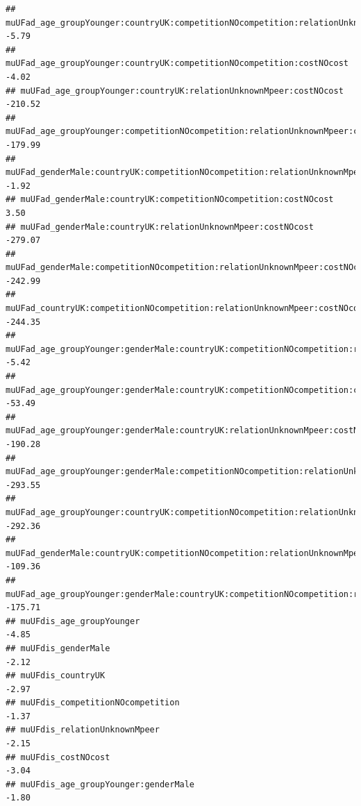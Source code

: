\documentclass[
]{article}
\begin{document}
\begin{verbatim}
## muUFad_age_groupYounger:countryUK:competitionNOcompetition:relationUnknownMpeer                           -5.79
## muUFad_age_groupYounger:countryUK:competitionNOcompetition:costNOcost                                     -4.02
## muUFad_age_groupYounger:countryUK:relationUnknownMpeer:costNOcost                                       -210.52
## muUFad_age_groupYounger:competitionNOcompetition:relationUnknownMpeer:costNOcost                        -179.99
## muUFad_genderMale:countryUK:competitionNOcompetition:relationUnknownMpeer                                 -1.92
## muUFad_genderMale:countryUK:competitionNOcompetition:costNOcost                                            3.50
## muUFad_genderMale:countryUK:relationUnknownMpeer:costNOcost                                             -279.07
## muUFad_genderMale:competitionNOcompetition:relationUnknownMpeer:costNOcost                              -242.99
## muUFad_countryUK:competitionNOcompetition:relationUnknownMpeer:costNOcost                               -244.35
## muUFad_age_groupYounger:genderMale:countryUK:competitionNOcompetition:relationUnknownMpeer                -5.42
## muUFad_age_groupYounger:genderMale:countryUK:competitionNOcompetition:costNOcost                         -53.49
## muUFad_age_groupYounger:genderMale:countryUK:relationUnknownMpeer:costNOcost                            -190.28
## muUFad_age_groupYounger:genderMale:competitionNOcompetition:relationUnknownMpeer:costNOcost             -293.55
## muUFad_age_groupYounger:countryUK:competitionNOcompetition:relationUnknownMpeer:costNOcost              -292.36
## muUFad_genderMale:countryUK:competitionNOcompetition:relationUnknownMpeer:costNOcost                    -109.36
## muUFad_age_groupYounger:genderMale:countryUK:competitionNOcompetition:relationUnknownMpeer:costNOcost   -175.71
## muUFdis_age_groupYounger                                                                                  -4.85
## muUFdis_genderMale                                                                                        -2.12
## muUFdis_countryUK                                                                                         -2.97
## muUFdis_competitionNOcompetition                                                                          -1.37
## muUFdis_relationUnknownMpeer                                                                              -2.15
## muUFdis_costNOcost                                                                                        -3.04
## muUFdis_age_groupYounger:genderMale                                                                       -1.80

\end{verbatim}
\end{document}
